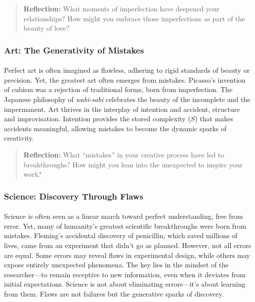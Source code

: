 \documentclass[12pt]{article}
\begin{document}
\begin{quote}
\textbf{Reflection:}  
What moments of imperfection have deepened your relationships? How might you embrace those imperfections as part of the beauty of love?
\end{quote}

\subsubsection{Art: The Generativity of Mistakes}
\paragraph{}
Perfect art is often imagined as flawless, adhering to rigid standards of beauty or precision. Yet, the greatest art often emerges from mistakes. Picasso’s invention of cubism was a rejection of traditional forms, born from imperfection. The Japanese philosophy of \textit{wabi-sabi} celebrates the beauty of the incomplete and the impermanent. Art thrives in the interplay of intention and accident, structure and improvisation. Intention provides the stored complexity (\(S\)) that makes accidents meaningful, allowing mistakes to become the dynamic sparks of creativity.

\begin{quote}
\textbf{Reflection:}  
What “mistakes” in your creative process have led to breakthroughs? How might you lean into the unexpected to inspire your work?
\end{quote}

\subsubsection{Science: Discovery Through Flaws}
\paragraph{}
Science is often seen as a linear march toward perfect understanding, free from error. Yet, many of humanity’s greatest scientific breakthroughs were born from mistakes. Fleming’s accidental discovery of penicillin, which saved millions of lives, came from an experiment that didn’t go as planned. However, not all errors are equal. Some errors may reveal flaws in experimental design, while others may expose entirely unexpected phenomena. The key lies in the mindset of the researcher—to remain receptive to new information, even when it deviates from initial expectations. Science is not about eliminating errors—it’s about learning from them. Flaws are not failures but the generative sparks of discovery.
\end{document}
